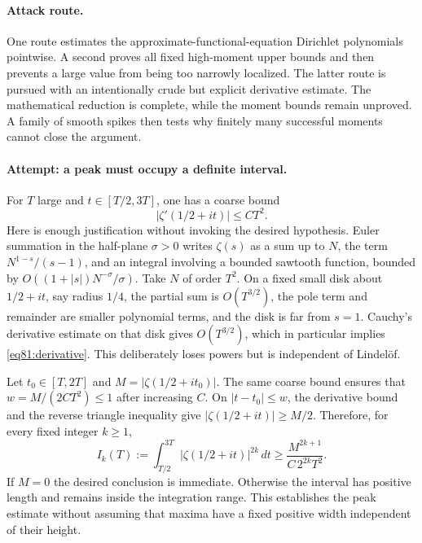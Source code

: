 \documentclass[11pt,a4paper]{article}
\numberwithin{equation}{section}
\begin{document}
\paragraph{Attack route.}
One route estimates the approximate-functional-equation Dirichlet polynomials
pointwise. A second proves all fixed high-moment upper bounds and then
prevents a large value from being too narrowly localized. The latter route
is pursued with an intentionally crude but explicit derivative estimate.
The mathematical reduction is complete, while the moment bounds remain
unproved. A family of smooth spikes then tests why finitely many successful
moments cannot close the argument.

\paragraph{Attempt: a peak must occupy a definite interval.}
For $T$ large and $t\in[T/2,3T]$, one has a coarse bound
\begin{equation}\label{eq81:derivative}
 |\zeta'(1/2+it)|\leq CT^2.
\end{equation}
Here is enough justification without invoking the desired hypothesis.
Euler summation in the half-plane $\sigma>0$ writes $\zeta(s)$ as a
sum up to $N$, the term $N^{1-s}/(s-1)$, and an integral involving a
bounded sawtooth function, bounded by
$O((1+|s|)N^{-\sigma}/\sigma)$. Take $N$ of order $T^2$.
On a fixed small disk about $1/2+it$, say radius $1/4$, the partial sum
is $O(T^{3/2})$, the pole term and remainder are smaller polynomial terms,
and the disk is far from $s=1$. Cauchy's derivative estimate on that disk
gives $O(T^{3/2})$, which in particular implies \eqref{eq81:derivative}.
This deliberately loses powers but is independent of Lindel\"of.

Let $t_0\in[T,2T]$ and $M=|\zeta(1/2+it_0)|$. The same coarse bound
ensures that $w=M/(2CT^2)\leq1$ after increasing $C$.
On $|t-t_0|\leq w$, the derivative bound and the reverse triangle inequality
give $|\zeta(1/2+it)|\geq M/2$. Therefore, for every fixed integer $k\geq1$,
\begin{equation}\label{eq81:peak}
 I_k(T):=\int_{T/2}^{3T}|\zeta(1/2+it)|^{2k}\,dt
 \geq\frac{M^{2k+1}}{C\,2^{2k}T^2}.
\end{equation}
If $M=0$ the desired conclusion is immediate. Otherwise the interval has
positive length and remains inside the integration range. This establishes
the peak estimate without assuming that maxima have a fixed positive
width independent of their height.
\end{document}
